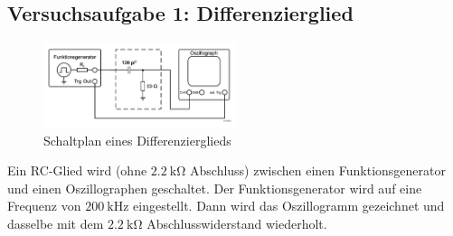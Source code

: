 \documentclass{article}
\begin{document}
		
		\subsection{Versuchsaufgabe 1: Differenzierglied}


			\begin{figure}[H]
				\centering
				\includegraphics[width=0.5\textwidth]{figs/Aufbau_1_1_Differenzierglied.png}
				\caption{Schaltplan eines Differenzierglieds~\cite{anleitung}}
				\label{fig:aufbau_1_1_differenzierglied}
			\end{figure}
			Ein RC-Glied wird (ohne $\SI{2.2}{\kilo\ohm}$ Abschluss) zwischen einen Funktionsgenerator und einen Oszillographen geschaltet. Der Funktionsgenerator wird auf eine Frequenz von $\SI{200}{\kilo\hertz}$ eingestellt. Dann wird das Oszillogramm gezeichnet und dasselbe mit dem $\SI{2.2}{\kilo\ohm}$ Abschlusswiderstand wiederholt.
			
\end{document}
